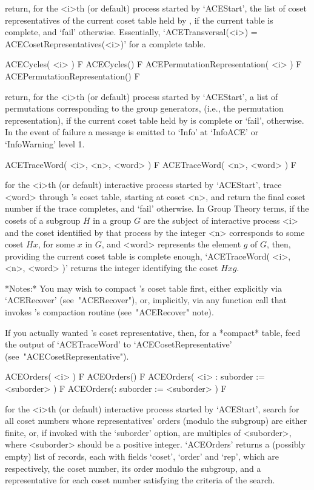return, for the <i>th (or default) process started by `ACEStart',  the
list of coset representatives of  the  current  coset  table  held  by
{\ACE}, if the  current  table  is  complete,  and  `fail'  otherwise.
Essentially, `ACETransversal(<i>) = ACECosetRepresentatives(<i>)'  for
a complete table.

\>ACECycles( <i> ) F
\>ACECycles() F
\>ACEPermutationRepresentation( <i> ) F
\>ACEPermutationRepresentation() F

return, for the <i>th (or default) process started  by  `ACEStart',  a
list of permutations corresponding to the group generators, (i.e., the
permutation representation), if the current coset table held by {\ACE}
is complete or `fail', otherwise. In the event of failure a message is
emitted to `Info' at `InfoACE' or `InfoWarning' level 1.

\>ACETraceWord( <i>, <n>, <word> ) F
\>ACETraceWord( <n>, <word> ) F

for the <i>th (or  default)  interactive  {\ACE}  process  started  by
`ACEStart', trace <word> through {\ACE}'s  coset  table,  starting  at
coset <n>, and return the final coset number if the  trace  completes,
and `fail' otherwise. In Group  Theory  terms,  if  the  cosets  of  a
subgroup $H$ in a group $G$ are  the  subject  of  interactive  {\ACE}
process <i> and the coset identified by that process  by  the  integer
<n> corresponds to some coset $Hx$, for some $x$ in  $G$,  and  <word>
represents the element $g$ of $G$, then, providing the  current  coset
table is complete enough, `ACETraceWord( <i>, <n>, <word>  )'  returns
the integer identifying the coset $Hxg$.

*Notes:*
You may wish to compact {\ACE}'s coset table first, either  explicitly
via `ACERecover' (see~"ACERecover"), or, implicitly, via any  function
call that invokes {\ACE}'s compaction routine (see~"ACERecover" note).

If you actually wanted {\ACE}'s  coset  representative,  then,  for  a
*compact*   table,   feed   the   output    of    `ACETraceWord'    to
`ACECosetRepresentative' (see~"ACECosetRepresentative").

\>ACEOrders( <i> ) F
\>ACEOrders() F
\>ACEOrders( <i> : suborder := <suborder> ) F
\>ACEOrders(: suborder := <suborder> ) F

for the <i>th (or  default)  interactive  {\ACE}  process  started  by
`ACEStart', search for all coset numbers whose representatives' orders
(modulo the subgroup) are either  finite,  or,  if  invoked  with  the
`suborder' option,  are  multiples  of  <suborder>,  where  <suborder>
should be a positive integer. `ACEOrders' returns a  (possibly  empty)
list of records, each with fields `coset', `order'  and  `rep',  which
are respectively, the coset number, its order modulo the subgroup, and
a representative for each coset number satisfying the criteria of  the
search.

